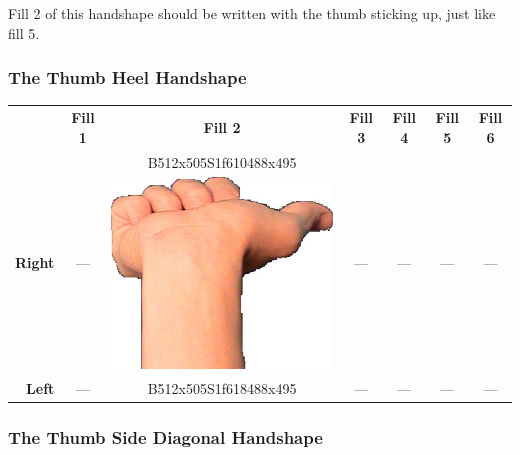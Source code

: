 \documentclass{article}
\begin{document}
Fill 2 of this handshape should be written with the thumb sticking up, just like fill 5.

\subsubsection{The Thumb Heel Handshape}

\begin{center}
\begin{tabular}{r*{6}{c}}
&\textbf{Fill 1}&\textbf{Fill 2}&\textbf{Fill 3}&\textbf{Fill 4}&\textbf{Fill 5}&\textbf{Fill 6}\\
\multirow{2}{*}{\textbf{Right}}&
\multirow{2}{*}{---}&
B512x505S1f610488x495&
\multirow{2}{*}{---}&
\multirow{2}{*}{---}&
\multirow{2}{*}{---}&
\multirow{2}{*}{---}\\
&
&
\includegraphics[scale=0.1]{images/10-02-2.jpg}\\
\textbf{Left}&
---&
B512x505S1f618488x495&
---&
---&
---&
---\\
\end{tabular}
\end{center}

\subsubsection{The Thumb Side Diagonal Handshape}
\end{document}
